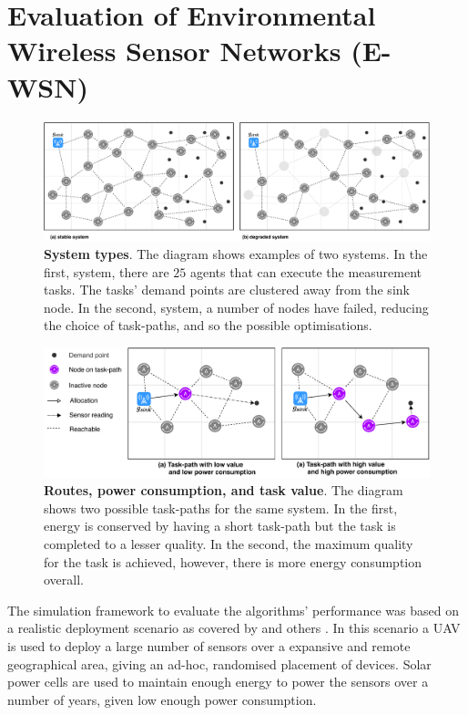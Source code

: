 \section{Evaluation of Environmental Wireless Sensor Networks (E-WSN)}
\label{section:experimental}	
\begin{figure}[ht]
	\centering
	\includegraphics[width=0.9\linewidth, trim={25pt 0pt 25pt 0pt, clip}]{system-types}
	\caption{\textbf{System types}. The diagram shows examples of two systems. In the first, \simulationSimple{}{} system, there are $25$ agents that can execute the measurement tasks. The tasks' demand points are clustered away from the sink node. In the second, \simulationNodeFailure{}{} system, a number of nodes have failed, reducing the choice of task-paths, and so the possible optimisations.}
	\label{fig:system-types}
\end{figure}
\begin{figure}[ht]
	\centering
	\includegraphics[width=0.9\linewidth, trim={25pt 0pt 25pt 0pt, clip}]{route-types}
	\caption{\textbf{Routes, power consumption, and task value}. The diagram shows two possible task-paths for the same system. In the first, energy is conserved by having a short task-path but the task is completed to a lesser quality. In the second, the maximum quality for the task is achieved, however, there is more energy consumption overall.}
	\label{fig:route_types}
\end{figure}

The simulation framework to evaluate the algorithms' performance was based on a realistic deployment scenario as covered by  \cite{Gomez2015} and others \citep{Jha2016, Avram}. In this scenario a UAV is used to deploy a large number of sensors over a expansive and remote geographical area, giving an ad-hoc, randomised placement of devices. Solar power cells are used to maintain enough energy to power the sensors over a number of years, given low enough power consumption. 

